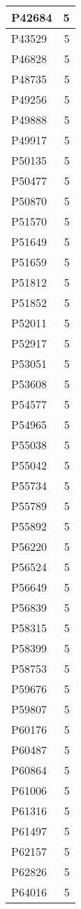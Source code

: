 \documentclass[
]{book}
\theoremstyle{definition}
\theoremstyle{definition}
\theoremstyle{definition}
\theoremstyle{definition}
\theoremstyle{remark}
\begin{document}
\begin{table}
\begin{tabular}{l|r}
\hline
P42684 & 5\\
\hline
P43529 & 5\\
\hline
P46828 & 5\\
\hline
P48735 & 5\\
\hline
P49256 & 5\\
\hline
P49888 & 5\\
\hline
P49917 & 5\\
\hline
P50135 & 5\\
\hline
P50477 & 5\\
\hline
P50870 & 5\\
\hline
P51570 & 5\\
\hline
P51649 & 5\\
\hline
P51659 & 5\\
\hline
P51812 & 5\\
\hline
P51852 & 5\\
\hline
P52011 & 5\\
\hline
P52917 & 5\\
\hline
P53051 & 5\\
\hline
P53608 & 5\\
\hline
P54577 & 5\\
\hline
P54965 & 5\\
\hline
P55038 & 5\\
\hline
P55042 & 5\\
\hline
P55734 & 5\\
\hline
P55789 & 5\\
\hline
P55892 & 5\\
\hline
P56220 & 5\\
\hline
P56524 & 5\\
\hline
P56649 & 5\\
\hline
P56839 & 5\\
\hline
P58315 & 5\\
\hline
P58399 & 5\\
\hline
P58753 & 5\\
\hline
P59676 & 5\\
\hline
P59807 & 5\\
\hline
P60176 & 5\\
\hline
P60487 & 5\\
\hline
P60864 & 5\\
\hline
P61006 & 5\\
\hline
P61316 & 5\\
\hline
P61497 & 5\\
\hline
P62157 & 5\\
\hline
P62826 & 5\\
\hline
P64016 & 5\\

\end{tabular}
\end{table}
\end{document}
